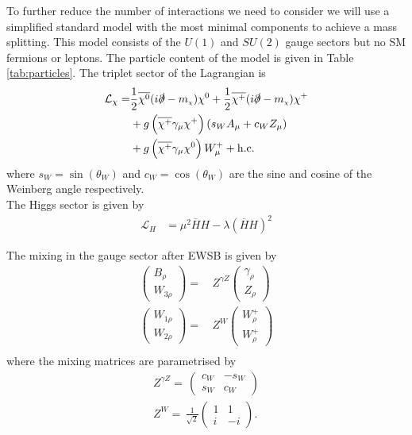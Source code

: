 \documentclass[11pt]{article}
\newcommand{\mychi}{\raisebox{0pt}[1ex][1ex]{\tiny$\chi$}}
\newcommand{\mychibig}{\raisebox{0pt}[1ex][1ex]{$\chi$}}
\def\mc{m_{\mychi}}
\begin{document}
To further reduce the number of interactions we need to consider we will use a simplified standard model with the most minimal components to achieve a mass splitting.  This model consists of the $U(1)$ and $SU(2)$ gauge sectors but no SM fermions or leptons.  The particle content of the model is given in Table \ref{tab:particles}.  The triplet sector of the Lagrangian is
\begin{align}
\begin{split}
\mathcal{L}_{\chi}=&\frac{1}{2}\overline{\mychibig^0}(i\slashed{\partial}-\mc)\mychibig^0+\frac{1}{2}\overline{\mychibig^+}(i\slashed{\partial}-\mc)\mychibig^{+}\\
&+g\left(\overline{\mychibig^+}\gamma_{\mu}\mychibig^+\right)\left(s_WA_{\mu}+c_WZ_{\mu}\right)\\
&+g\left(\overline{\mychibig^+}\gamma_{\mu}\mychibig^0 \right)W_{\mu}^++\text{h.c.}
\end{split}
\end{align}
where $s_W=\sin(\theta_W)$ and $c_W=\cos(\theta_W)$ are the sine and cosine of the Weinberg angle respectively.\\

The Higgs sector is given by
\begin{align}
\mathcal{L}_{H}&=\mu^2 \overline{H}H-\lambda(\overline{H}H)^2
\end{align}

The mixing in the gauge sector after EWSB is given by
\begin{align} 
\left(\begin{array}{c} 
B_{{\rho}}\\ 
W_{{3 \rho}}\end{array} \right) 
 = & \,Z^{\gamma Z}
\left(\begin{array}{c} 
\gamma_{{\rho}}\\ 
Z_{{\rho}}\end{array} \right) \\ 
\left(\begin{array}{c} 
W_{{1 \rho}}\\ 
W_{{2 \rho}}\end{array} \right) 
 = & \,Z^{W}
\left(\begin{array}{c} 
W^+_{{\rho}}\\ 
W^+_{{\rho}}\end{array} \right) \\ 
\end{align} 
where the mixing matrices are parametrised by \\ 
\begin{align} 
Z^{\gamma Z}= \, \left( 
\begin{array}{cc} 
c_W  & - s_W   \\ 
 s_W  & c_W \end{array} 
\right) \\ 
Z^{W}= \,\frac{1}{\sqrt{2}}  \left( 
\begin{array}{cc} 
1& 1 \\ 
 i   & -i  \end{array} 
\right). \\ 
\end{align} 
\end{document}

